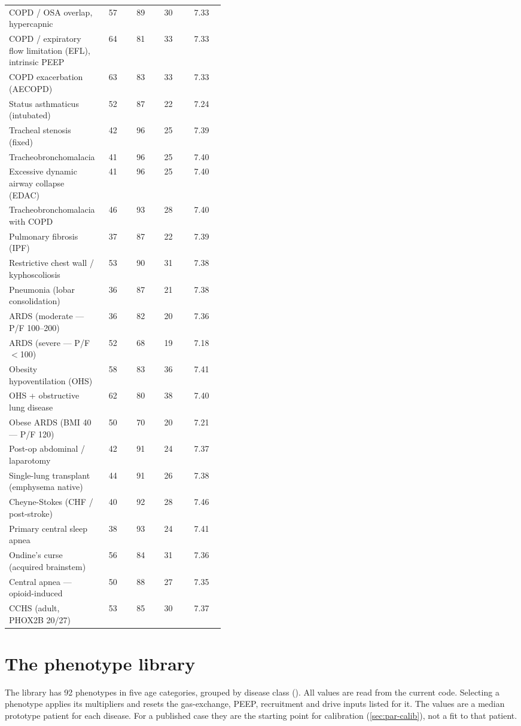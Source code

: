 {\begin{longtable}{@{}>{\raggedright\arraybackslash}p{0.42\linewidth}cccc@{}}
COPD / OSA overlap, hypercapnic & 57 & 89 & 30 & 7.33\\
COPD / expiratory flow limitation (EFL), intrinsic PEEP & 64 & 81 & 33 & 7.33\\
COPD exacerbation (AECOPD) & 63 & 83 & 33 & 7.33\\
Status asthmaticus (intubated) & 52 & 87 & 22 & 7.24\\
Tracheal stenosis (fixed) & 42 & 96 & 25 & 7.39\\
Tracheobronchomalacia & 41 & 96 & 25 & 7.40\\
Excessive dynamic airway collapse (EDAC) & 41 & 96 & 25 & 7.40\\
Tracheobronchomalacia with COPD & 46 & 93 & 28 & 7.40\\
Pulmonary fibrosis (IPF) & 37 & 87 & 22 & 7.39\\
Restrictive chest wall / kyphoscoliosis & 53 & 90 & 31 & 7.38\\
Pneumonia (lobar consolidation) & 36 & 87 & 21 & 7.38\\
ARDS (moderate --- P/F 100--200) & 36 & 82 & 20 & 7.36\\
ARDS (severe --- P/F $<$100) & 52 & 68 & 19 & 7.18\\
Obesity hypoventilation (OHS) & 58 & 83 & 36 & 7.41\\
OHS + obstructive lung disease & 62 & 80 & 38 & 7.40\\
Obese ARDS (BMI 40 --- P/F 120) & 50 & 70 & 20 & 7.21\\
Post-op abdominal / laparotomy & 42 & 91 & 24 & 7.37\\
Single-lung transplant (emphysema native) & 44 & 91 & 26 & 7.38\\
Cheyne-Stokes (CHF / post-stroke) & 40 & 92 & 28 & 7.46\\
Primary central sleep apnea & 38 & 93 & 24 & 7.41\\
Ondine's curse (acquired brainstem) & 56 & 84 & 31 & 7.36\\
Central apnea --- opioid-induced & 50 & 88 & 27 & 7.35\\
CCHS (adult, PHOX2B 20/27) & 53 & 85 & 30 & 7.37\\
\end{longtable}}

\section{The phenotype library}
\label{sec:par-lib}
The library has 92 phenotypes in five age categories, grouped by disease class (). All values are read from the current code. Selecting a phenotype applies its multipliers and resets the gas-exchange, PEEP, recruitment and drive inputs listed for it. The values are a median prototype patient for each disease. For a published case they are the starting point for calibration (\cref{sec:par-calib}), not a fit to that patient.

